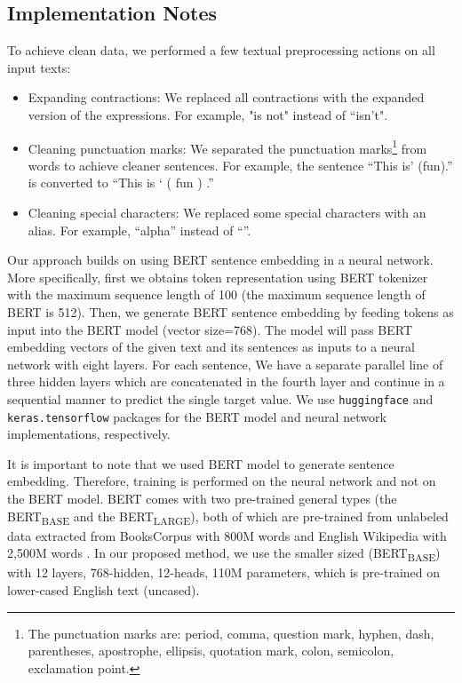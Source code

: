 \documentclass[journal]{IEEEtran}
\begin{document}
\subsection{Implementation Notes}

To achieve clean data, we performed a few textual preprocessing actions on all input texts:

\begin{itemize}
    \item Expanding contractions: We replaced all contractions with the expanded version of the expressions. For example, "is not" instead of “isn’t".
    \item Cleaning punctuation marks: We separated the punctuation marks\footnote{The punctuation marks are: period, comma, question mark, hyphen, dash, parentheses, apostrophe, ellipsis, quotation mark, colon, semicolon, exclamation point.} from words to achieve cleaner sentences. For example, the sentence “This is’ (fun).” is converted to “This is ‘ ( fun ) .”
    \item Cleaning special characters: We replaced some special characters with an alias. For example, “alpha” instead of “”.
\end{itemize}

Our approach builds on using BERT sentence embedding in a neural network. More specifically, first we obtains token representation using BERT tokenizer with the maximum sequence length of 100 (the maximum sequence length of BERT is 512). Then, we generate BERT sentence embedding by feeding tokens as input into the BERT model (vector size=768). The model will pass BERT embedding vectors of the given text and its sentences as inputs to a neural network with eight layers. For each sentence, We have a separate parallel line of three hidden layers which are concatenated in the fourth layer and continue in a sequential manner to predict the single target value. We use \verb+huggingface+ and \verb+keras.tensorflow+ packages for the BERT model and neural network implementations, respectively.

It is important to note that we used BERT model to generate sentence embedding. Therefore, training is performed on the neural network and not on the BERT model. BERT comes with two pre-trained general types (the BERT\textsubscript{BASE} and the BERT\textsubscript{LARGE}), both of which are pre-trained from unlabeled data extracted from BooksCorpus \cite{zhu2015aligning} with 800M words and English Wikipedia with 2,500M words \cite{devlin2018bert}. In our proposed method, we use the smaller sized (BERT\textsubscript{BASE}) with 12 layers, 768-hidden, 12-heads, 110M parameters, which is pre-trained on lower-cased English text (uncased).
\end{document}

